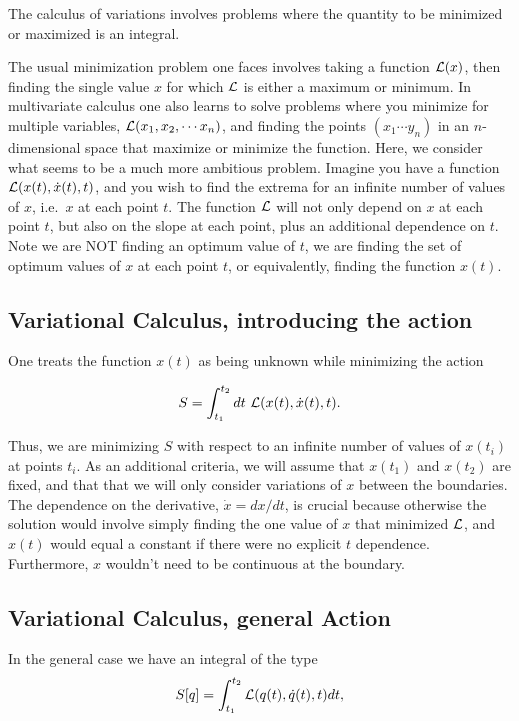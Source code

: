 \documentclass[%
oneside,                 %
final,                   %
10pt]{article}
\begin{document}
The calculus of variations involves 
problems where the quantity to be minimized or maximized is an integral. 

The usual minimization problem one faces involves taking a function
${\cal L}(x)$, then finding the single value $x$ for which ${\cal L}$
is either a maximum or minimum. In multivariate calculus one also
learns to solve problems where you minimize for multiple variables,
${\cal L}(x_1,x_2,\cdots x_n)$, and finding the points $(x_1\cdots
y_n)$ in an $n$-dimensional space that maximize or minimize the
function. Here, we consider what seems to be a much more ambitious
problem. Imagine you have a function ${\cal L}(x(t),\dot{x}(t),t)$,
and you wish to find the extrema for an infinite number of values of
$x$, i.e.~$x$ at each point $t$. The function ${\cal L}$ will not only
depend on $x$ at each point $t$, but also on the slope at each point,
plus an additional dependence on $t$. Note we are NOT finding an
optimum value of $t$, we are finding the set of optimum values of $x$
at each point $t$, or equivalently, finding the function $x(t)$.

\subsection*{Variational Calculus, introducing the action}

One treats the function $x(t)$ as being unknown while minimizing the action

\[
S=\int_{t_1}^{t_2}dt~{\cal L}(x(t),\dot{x}(t),t).
\]

Thus, we are minimizing $S$ with respect to an infinite number of
values of $x(t_i)$ at points $t_i$. As an additional criteria, we will
assume that $x(t_1)$ and $x(t_2)$ are fixed, and that that we will
only consider variations of $x$ between the boundaries. The dependence
on the derivative, $\dot{x}=dx/dt$, is crucial because otherwise the
solution would involve simply finding the one value of $x$ that
minimized ${\cal L}$, and $x(t)$ would equal a constant if there were no
explicit $t$ dependence. Furthermore, $x$ wouldn't need to be
continuous at the boundary.

\subsection*{Variational Calculus, general Action}

In the general case we have an integral of the type
\[ 
S[q]= \int_{t_1}^{t_2} {\cal L}(q(t),\dot{q}(t),t)dt,
\]
\end{document}
